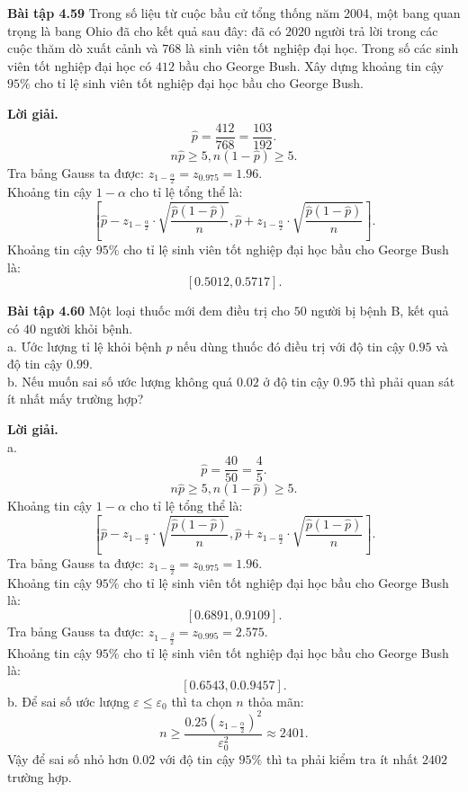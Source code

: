 \documentclass[12pt,a4paper]{article}
\begin{document}
\begin{mybox}
\textbf{Bài tập 4.59} Trong số liệu từ cuộc bầu cử tổng thống năm 2004, một bang quan trọng là bang Ohio đã cho kết quả sau đây: đã có $2020$ người trả lời trong các cuộc thăm dò xuất cảnh và $768$ là sinh viên tốt nghiệp đại học. Trong số các sinh viên tốt nghiệp đại học có $412$ bầu cho George Bush. Xây dựng khoảng tin cậy $95\%$ cho tỉ lệ sinh viên tốt nghiệp đại học bầu cho George Bush.
\end{mybox}
\textbf{Lời giải.} 
$$\widehat{p} = \frac{412}{768} = \frac{103}{192}.$$
$$n \widehat{p} \geqslant 5, n \left( {1 - \widehat{p}} \right) \geqslant 5.$$
Tra bảng Gauss ta được: $z_{1 - \frac{\alpha}{2}} = z_{0.975} = 1.96.$\\
Khoảng tin cậy $1 - \alpha$ cho tỉ lệ tổng thể là:
$$\left[ {\widehat{p} - z_{1 - \frac{\alpha}{2}} \cdot \sqrt{\frac{\widehat{p} \left( {1 - \widehat{p}} \right)}{n}}, \widehat{p} + z_{1 - \frac{\alpha}{2}} \cdot \sqrt{\frac{\widehat{p} \left( {1 - \widehat{p}} \right)}{n}}} \right].$$
Khoảng tin cậy $95\%$ cho tỉ lệ sinh viên tốt nghiệp đại học bầu cho George Bush là:
$$\left[ {0.5012, 0.5717} \right].$$

\begin{mybox}
\textbf{Bài tập 4.60} Một loại thuốc mới đem điều trị cho $50$ người bị bệnh B, kết quả có $40$ người khỏi bệnh.\\
a. Ước lượng tỉ lệ khỏi bệnh $p$ nếu dùng thuốc đó điều trị với độ tin cậy $0.95$ và độ tin cậy $0.99.$\\
b. Nếu muốn sai số ước lượng không quá $0.02$ ở độ tin cậy $0.95$ thì phải quan sát ít nhất mấy trường hợp?
\end{mybox}
\textbf{Lời giải.}\\
a.
$$\widehat{p} = \frac{40}{50} = \frac{4}{5}.$$
$$n \widehat{p} \geqslant 5, n \left( {1 - \widehat{p}} \right) \geqslant 5.$$
Khoảng tin cậy $1 - \alpha$ cho tỉ lệ tổng thể là:
$$\left[ {\widehat{p} - z_{1 - \frac{\alpha}{2}} \cdot \sqrt{\frac{\widehat{p} \left( {1 - \widehat{p}} \right)}{n}}, \widehat{p} + z_{1 - \frac{\alpha}{2}} \cdot \sqrt{\frac{\widehat{p} \left( {1 - \widehat{p}} \right)}{n}}} \right].$$
Tra bảng Gauss ta được: $z_{1 - \frac{\alpha}{2}} = z_{0.975} = 1.96.$\\
Khoảng tin cậy $95\%$ cho tỉ lệ sinh viên tốt nghiệp đại học bầu cho George Bush là:
$$\left[ {0.6891, 0.9109} \right].$$
Tra bảng Gauss ta được: $z_{1 - \frac{\beta}{2}} = z_{0.995} = 2.575.$\\
Khoảng tin cậy $95\%$ cho tỉ lệ sinh viên tốt nghiệp đại học bầu cho George Bush là:
$$\left[ {0.6543, 0.0.9457} \right].$$
b. Để sai số ước lượng $\varepsilon \leqslant \varepsilon_0$ thì ta chọn $n$ thỏa mãn:
$$n \geqslant \frac{{0.25{{\left( {{z_{1 - \frac{\alpha }{2}}}} \right)}^2}}}{{\varepsilon _0^2}} \approx 2401.$$
Vậy để sai số nhỏ hơn $0.02$ với độ tin cậy $95\%$ thì ta phải kiểm tra ít nhất $2402$ trường hợp.
\end{document}
